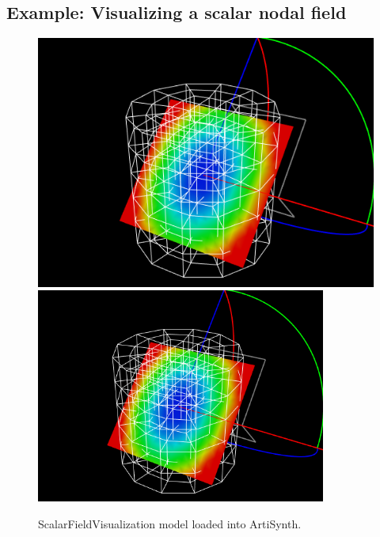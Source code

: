 \subsection{Example: Visualizing a scalar nodal field}
\label{ScalarFieldVisualization:sec}

\begin{figure}[t]
\begin{center}
\iflatexml
 \includegraphics[]{images/ScalarFieldVisualization}
\else
 \includegraphics[width=3.75in]{images/ScalarFieldVisualization}
\fi
\end{center}
\caption{ScalarFieldVisualization model loaded into ArtiSynth.}
\label{ScalarFieldVisualization:fig}
\end{figure}

